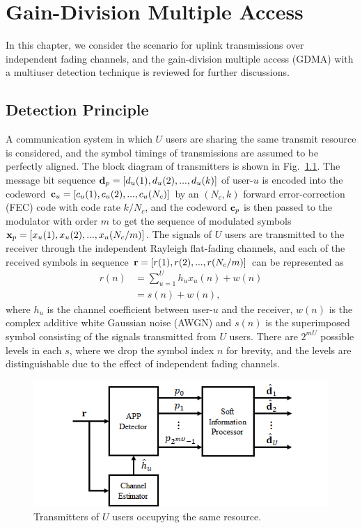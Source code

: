 \chapter{Gain-Division Multiple Access}
\label{c:gdma}

In this chapter, we consider the scenario for uplink transmissions over independent fading channels, and the gain-division multiple access (GDMA) with a multiuser detection technique is reviewed for further discussions.


\section{Detection Principle}

A communication system in which $U$ users are sharing the same transmit resource is considered, and the symbol timings of transmissions are assumed to be perfectly aligned. The block diagram of transmitters is shown in Fig.~\ref{fig:gdma_tx}. The message bit sequence ${\bf{d}}_p = [d_u(1), d_u(2), ..., d_u(k)]$ of user-$u$ is encoded into the codeword ${\bf{c}}_u = [c_u(1), c_u(2), ..., c_u(N_c)]$ by an $(N_c,k)$ forward error-correction (FEC) code with code rate $k/N_c$, and the codeword ${\bf{c}}_p$ is then passed to the modulator with order $m$ to get the sequence of modulated symbols ${\bf x}_p = [x_u(1), x_u(2), ..., x_u(N_c/m)]$. The signals of $U$ users are transmitted to the receiver through the independent Rayleigh flat-fading channels, and each of the received symbols in sequence ${\bf r} = [r(1), r(2), ..., r(N_c/m)]$ can be represented as
\begin{align} \label{equ:rx_sup}
 r(n) &= \sum_{u=1}^{U}h_{u}x_{u}(n) + w(n) \nonumber \\ &= s(n) + w(n) ,
\end{align}
where $h_u$ is the channel coefficient between user-$u$ and the receiver, $w(n)$ is the complex additive white Gaussian noise (AWGN) and $s(n)$ is the superimposed symbol consisting of the signals transmitted from $U$ users. There are $2^{mU}$ possible levels in each $s$, where we drop the symbol index $n$ for brevity, and the levels are distinguishable due to the effect of independent fading channels. 

\begin{figure}[t!]
 \centering
 \includegraphics[width=15cm]{fig/gdma_tx.png}
 \caption{Transmitters of $U$ users occupying the same resource.}
 \label{fig:gdma_tx}
\end{figure}

